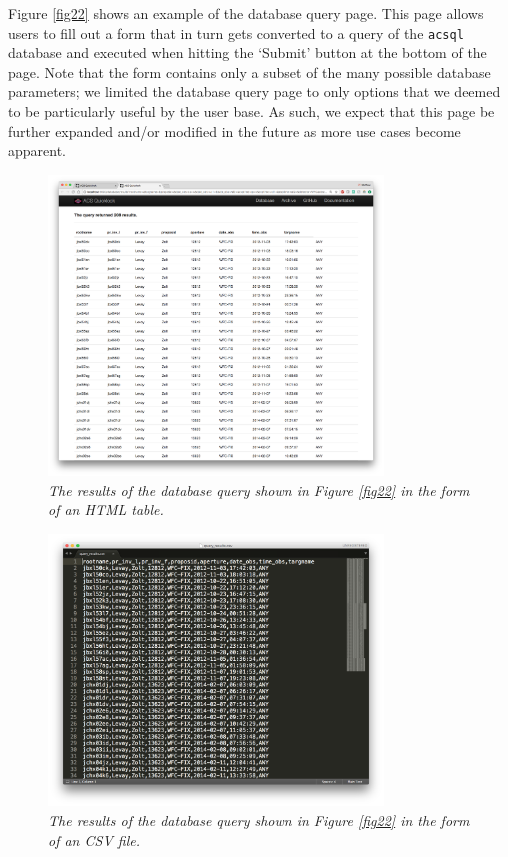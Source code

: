 \documentclass[10pt,journal,compsoc]{IEEEtran}
\begin{document}
Figure \ref{fig22} shows an example of the database query page.  This page allows users to fill out a form that in turn gets converted to a query of the \texttt{acsql} database and executed
when hitting the `Submit' button at the bottom of the page.  Note that the form contains only a subset of the many possible database parameters; we limited the database query page to only
options that we deemed to be particularly useful by the user base.  As such, we expect that this page be further expanded and/or modified in the future as more use cases become apparent.

\begin{figure}[!h]
\centering
\includegraphics[width=3.5in]{./figures/database_query_results_html.png}
\caption{\textit{The results of the database query shown in Figure \ref{fig22} in the form of an HTML table.}}
\label{fig23}
\end{figure}

\begin{figure}[!h]
\centering
\includegraphics[width=3.5in]{./figures/database_query_results_csv.png}
\caption{\textit{The results of the database query shown in Figure \ref{fig22} in the form of an CSV file.}}
\label{fig24}
\end{figure}
\end{document}
